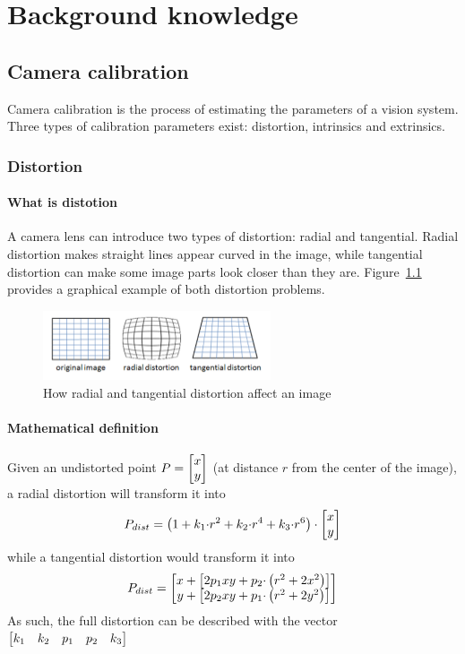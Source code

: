 \chapter{Background knowledge}
\label{chap:background}

\section{Camera calibration}

Camera calibration is the process of estimating the parameters of a vision system.
Three types of calibration parameters exist: distortion, intrinsics and extrinsics.

\subsection[Distortion]{Distortion~\cite{calib-dist}}

\subsubsection{What is distotion}

A camera lens can introduce two types of distortion: radial and tangential.
Radial distortion makes straight lines appear curved in the image, while tangential distortion can make some image parts look closer than they are.
Figure~\ref{fig:distortion} provides a graphical example of both distortion problems.

\begin{figure}
	\centerline{\includegraphics[width=0.6\textwidth]{images/distortion.png}}
	\caption{\centering How radial and tangential distortion affect an image}
	\label{fig:distortion}
\end{figure}

\subsubsection{Mathematical definition}

Given an undistorted point $P=\begin{bmatrix} x \\ y \end{bmatrix}$ (at distance $r$ from the center of the image), a radial distortion will transform it into
\begin{equation}
	P_{dist} = \left( 1 + k_1{\cdot}r^2 + k_2{\cdot}r^4 + k_3{\cdot}r^6 \right) \cdot \begin{bmatrix} x \\ y \end{bmatrix}
\end{equation}
while a tangential distortion would transform it into
\begin{equation}
	P_{dist} = \begin{bmatrix} x+\left[ 2p_1xy + p_2{\cdot}\left( r^2+2x^2 \right) \right] \\ y+\left[ 2p_2xy + p_1{\cdot}\left( r^2+2y^2 \right) \right] \end{bmatrix}
\end{equation}
As such, the full distortion can be described with the vector $\begin{bmatrix} k_1 & k_2 & p_1 & p_2 & k_3 \end{bmatrix}$

